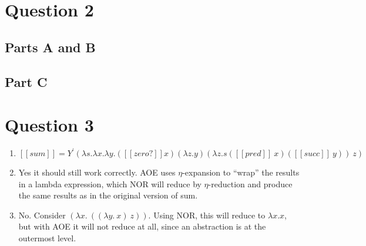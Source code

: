 \documentclass[onecolumn,11pt]{article}
\newcommand{\sem}[1]{\ensuremath{[\![#1]\!]}}
\begin{document}
\section*{Question 2}

\subsection*{Parts A and B}
\begin{alltt}
\end{alltt}

\subsection*{Part C}
\begin{alltt}
\end{alltt}

\section*{Question 3}

\begin{enumerate}
\item $\sem{sum} = Y^{\prime}(\lambda s. \lambda x. \lambda y. (\sem{zero?} x)(\lambda z.y) (\lambda z. s(\sem{pred}\ x)(\sem{succ}\ y))\ z)$

\item Yes it should still work correctly. AOE uses $\eta$-expansion to ``wrap'' the results in a lambda expression, which NOR will reduce by $\eta$-reduction and produce the same results as in the original version of sum.

\item No. Consider $(\lambda x.\ ((\lambda y.\ x)\ z))$. Using NOR, this will reduce to $\lambda x.x$, but with AOE it will not reduce at all, since an abstraction is at the outermost level.

\end{enumerate}
\end{document}

